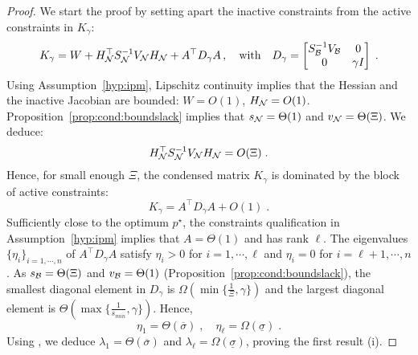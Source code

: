 \begin{proof}
  We start the proof by setting apart the inactive constraints from the active constraints in $K_\gamma$:
  \begin{equation}
    K_\gamma = W + H_{\mathcal{N}}^\top S_{\mathcal{N}}^{-1} V_{\mathcal{N}} H_{\mathcal{N}}
    + A^\top D_\gamma A \, ,
    \quad
    \text{with} \quad D_\gamma = \begin{bmatrix} S_{\mathcal{B}}^{-1} V_{\mathcal{B}} & 0 \\ 0 & \gamma I \end{bmatrix} \; .
  \end{equation}
  Using Assumption~\ref{hyp:ipm}, Lipschitz
  continuity implies that the Hessian and the inactive Jacobian
  are bounded: $W = O(1)$, $H_{\mathcal{N}} = O(1)$.
  Proposition~\ref{prop:cond:boundslack} implies that
  $s_{\mathcal{N}} = \Theta(1)$ and $v_{\mathcal{N}} = \Theta(\Xi)$. We deduce:
  \begin{equation}
    \label{eq:cond:inactiveblock}
    H_{\mathcal{N}}^\top S_{\mathcal{N}}^{-1} V_{\mathcal{N}} H_{\mathcal{N}} = O(\Xi) \; .
  \end{equation}
  Hence, for small enough $\Xi$,
  the condensed matrix $K_\gamma$ is dominated by the block of active constraints:
  \begin{equation}
    K_\gamma = A^\top D_\gamma A + O(1) \; .
  \end{equation}
  Sufficiently close to the optimum $p^\star$, the constraints qualification
  in Assumption~\ref{hyp:ipm} implies that $A = \Theta(1)$ and has rank $\ell$.
  The eigenvalues $\{\eta_i\}_{i =1,\cdots,n}$ of $A^\top D_\gamma A$
  satisfy $\eta_i > 0$ for $i = 1,\cdots,\ell$ and $\eta_i = 0$ for $i = \ell+1, \cdots, n$.
  As $s_{\mathcal{B}} = \Theta(\Xi)$ and $v_{\mathcal{B}} = \Theta(1)$
  (Proposition~\ref{prop:cond:boundslack}), the smallest diagonal
  element in $D_\gamma$ is $\Omega(\min\{\frac{1}{\Xi}, \gamma\})$
  and the largest diagonal element is $\Theta(\max\{\frac{1}{s_{min}}, \gamma\})$.
  Hence,
  \begin{equation}
    \eta_1 = \Theta(\overline{\sigma}) \; , \quad
    \eta_\ell = \Omega(\underline{\sigma}) \; .
  \end{equation}
  Using \cite[Lemma 3.1]{wright1998ill}, we deduce $\lambda_1 = \Theta(\overline{\sigma})$
  and $\lambda_\ell = \Omega(\underline{\sigma})$, proving the first result (i).


\end{proof}
